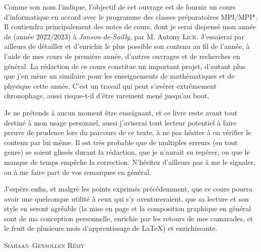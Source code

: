 \documentclass[a4paper,french,bookmarks]{book}
\begin{document}
    \begin{center}
        \begin{minipage}{0.85\linewidth}
            \large \qquad Comme son nom l'indique, l'objectif de cet ouvrage est de fournir un cours d'informatique en accord avec le programme des classes préparatoires \textsf{MPI/MPI*}. Il contiendra principalement des notes de cours, dont je serai dispensé mon année de  (année 2022/2023) à \textit{Janson-de-Sailly}, par M. Antony \textsc{Lick}. J'essaierai par ailleurs de détailler et d'enrichir le plus possible son contenu au fil de l'année, à l'aide de mes cours de première année, d'autres ouvrages et de recherches en général. La rédaction de ce cours constitue un important projet, d'autant plus que j'en mène un similaire pour les enseignements de mathématiques et de physique cette année. C'est un travail qui peut s'avérer extrêmement chronophage, aussi risque-t-il d'être rarement mené jusqu'au bout.\newline
    
            \qquad Je ne prétends à aucun moment être enseignant, et ce livre reste avant tout destiné à mon usage personnel, aussi j'aviserai tout lecteur potentiel à faire preuve de prudence lors du parcours de ce texte, à ne pas hésiter à en vérifier le contenu par lui même. Il est très probable que de multiples erreurs (en tout genre) se soient glissés durant la rédaction, que je n'aurait su repérer, ou que le manque de temps empêche la correction. N'hésitez d'ailleurs pas à me le signaler, ou à me faire part de vos remarques en général.\newline
    
            \qquad J'espère enfin, et malgré les points exprimés précédemment, que ce cours pourra avoir une quelconque utilité à ceux qui s'y aventureraient, que sa lecture et son style en seront agréable (la mise en page et la composition graphique en général sont de ma conception personnelle, enrichie par les retours de mes camarades, et le fruit de plusieurs mois d'apprentissage de \LaTeX) et enrichissante.\newline\newline\newline\text{}
        \end{minipage}
    \end{center}
    
    \hfill{\large\textsc{Siahaan--Gensollen Rémy}}
    
    \pagestyle{intro}
    
\end{document}

